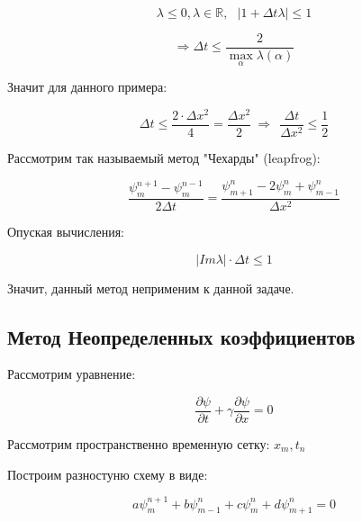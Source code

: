 \documentclass[10pt,a4paper]{article}
\begin{document}
	\begin{equation}
		\lambda \leqslant 0, \lambda \in \mathbb{R},\ \ \ \left| 1 + \Delta t
		\lambda	\right| \leqslant 1
	\end{equation}
	
	\begin{equation}
		\Rightarrow \Delta t \leqslant \frac{2}{\max\limits_{\alpha}\lambda
		\left(\alpha\right)}
	\end{equation}
	
	Значит для данного примера:
	
	\begin{equation}
		\Delta t\leqslant \frac{2\cdot\Delta x^{2}}{4} = \frac{\Delta x^{2}}{2}
		\ \Rightarrow \ \ \frac{\Delta t}{\Delta x^{2}} \leqslant \frac{1}{2}
	\end{equation}
	
	Рассмотрим так называемый метод "Чехарды" (leapfrog):
	
	\begin{equation}
		\frac{\psi^{n + 1}_{m} - \psi^{n - 1}_{m}}{2\Delta t} = 
		\frac{\psi_{m + 1}^{n} - 2\psi_{m}^{n} + \psi_{m - 1}^{n}}{\Delta x^{2}}
	\end{equation}
	
	Опуская вычисления:
	
	\begin{equation}
		\left|Im \lambda\right|\cdot \Delta t \leqslant 1
	\end{equation}
	
	Значит, данный метод неприменим к данной задаче.
	
	\subsection{Метод Неопределенных коэффициентов}
	
	Рассмотрим уравнение:
	
	\begin{equation}
		\frac{\partial \psi}{\partial t} + \gamma\frac{\partial \psi}{\partial 
		x} = 0
	\end{equation}
	
	Рассмотрим пространственно временную сетку: $x_{m}, t_{n}$
	
	Построим разностуню схему в виде:
	
	\begin{equation}
		a\psi^{n + 1}_{m} + b\psi^{n}_{m - 1} + c\psi^{n}_{m} + d\psi_{m + 1}
		^{n} = 0
	\end{equation}
	
\end{document}
